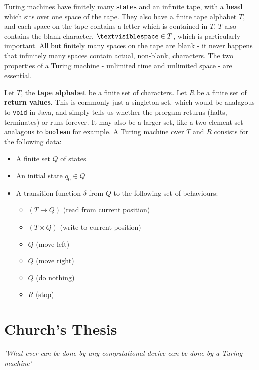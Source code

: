 \documentclass[11pt]{article}
\begin{document}
	\par 
	Turing machines have finitely many \textbf{states} and an infinite tape, with a \textbf{head} which sits over one space of the tape. They also have a finite tape alphabet $T$, and each space on the tape contains a letter which is contained in $T$. $T$ also contains the blank character, $\textvisiblespace \in T$, which is particularly important. All but finitely many spaces on the tape are blank - it never happens that infinitely many spaces contain actual, non-blank, characters. The two properties of a Turing machine - unlimited time and unlimited space - are essential.
	
	\par 
	Let $T$, the \textbf{tape alphabet} be a finite set of characters. Let $R$ be a finite set of \textbf{return values}. This is commonly just a singleton set, which would be analagous to \texttt{void} in Java, and simply tells us whether the prorgam returns (halts, terminates) or runs forever. It may also be a larger set, like a two-element set analagous to \texttt{boolean} for example. A Turing machine over $T$ and $R$ consists for the following data:
	\begin{itemize}
		\item A finite set $Q$ of states
		\item An initial state $q_{0} \in Q$
		\item A transition function $\delta$ from $Q$ to the following set of behaviours:
			\begin{itemize}
				\item $(T \rightarrow Q)$ (read from current position)
				\item $(T \times Q)$ (write to current position)
				\item $Q$ (move left)
				\item $Q$ (move right)
				\item $Q$ (do nothing)
				\item $R$ (stop)
			\end{itemize}
	\end{itemize}
	
	\section{Church's Thesis}
	\textit{'What ever can be done by any computational device can be done by a Turing machine'}
	\linebreak
	
\end{document}
